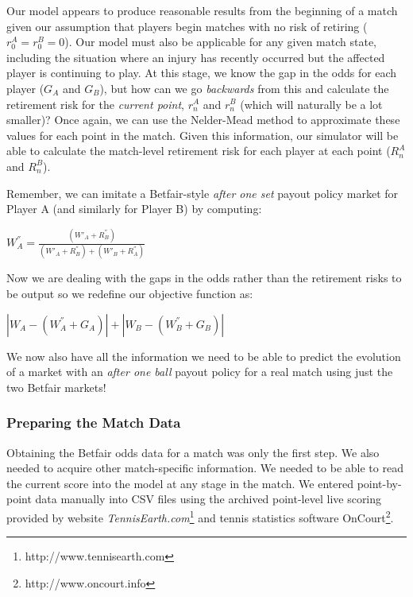 \documentclass[letterpaper,12pt]{article}
\begin{document}
Our model appears to produce reasonable results from the beginning of a match given our assumption that players begin matches with no risk of retiring ($r_0^A = r_0^B = 0$).  Our model must also be applicable for any given match state, including the situation where an injury has recently occurred but the affected player is continuing to play.  At this stage, we know the gap in the odds for each player ($G_A$ and $G_B$), but how can we go \textit{backwards} from this and calculate the retirement risk for the \textit{current point}, $r_n^A$ and $r_n^B$ (which will naturally be a lot smaller)?  Once again, we can use the Nelder-Mead method to approximate these values for each point in the match.  Given this information, our simulator will be able to calculate the match-level retirement risk for each player at each point ($R_n^A$ and $R_n^B$).

Remember, we can imitate a Betfair-style \textit{after one set} payout policy market for Player A (and similarly for Player B) by computing:

\begin{center}
	$W_A^{''} = \frac{(W'_A + R_B^{''})}{(W'_A + R_B^{''}) + (W'_B + R_A^{''})}$
\end{center}

Now we are dealing with the gaps in the odds rather than the retirement risks to be output so we redefine our objective function as:

\begin{center}
	$\left|W_A - (W_A^{''} + G_A)\right| + \left|W_B - (W_B^{''} + G_B)\right|$
\end{center}

We now also have all the information we need to be able to predict the evolution of a market with an \textit{after one ball} payout policy for a real match using just the two Betfair markets!

\subsubsection{Preparing the Match Data}

Obtaining the Betfair odds data for a match was only the first step.  We also needed to acquire other match-specific information.  We needed to be able to read the current score into the model at any stage in the match.  We entered point-by-point data manually into CSV files using the archived point-level live scoring provided by website \textit{TennisEarth.com}\footnote{http://www.tennisearth.com} and tennis statistics software OnCourt\footnote{http://www.oncourt.info}.  
\end{document}
